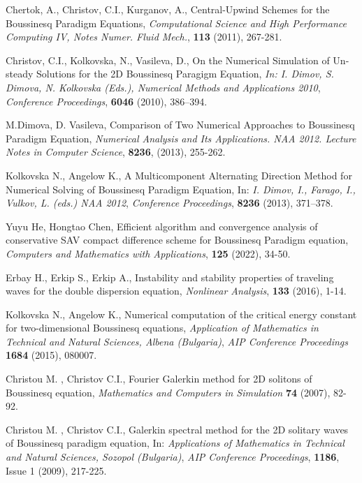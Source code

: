 \documentclass[a4paper]{article}
\theoremstyle{remark}
\begin{document}
\begin{large}
\begin{thebibliography}{99}
	 Chertok, A., Christov, C.I., Kurganov, A., Central-Upwind Schemes for the Boussinesq Paradigm Equations,
{\it Computational Science and High Performance Computing IV, Notes Numer. Fluid Mech.}, \textbf{113} (2011), 267-281.

	 Christov, C.I., Kolkovska, N., Vasileva, D., On the Numerical Simulation of Un-steady Solutions for the 2D Boussinesq Paragigm Equation,
{\it In: I. Dimov, S. Dimova, N. Kolkovska (Eds.), Numerical Methods and Applications 2010},
\emph{Conference Proceedings}, \textbf{6046} (2010), 386–394.

	 M.Dimova, D. Vasileva, Comparison of Two Numerical Approaches to Boussinesq Paradigm Equation, 
{\it Numerical Analysis and Its Applications. NAA 2012. Lecture Notes in Computer Science}, \textbf{8236}, (2013), 255-262.

	 Kolkovska N., Angelow K., A Multicomponent Alternating Direction Method for Numerical Solving of Boussinesq Paradigm Equation,
In: {\it  I. Dimov, I., Farago, I., Vulkov, L. (eds.) NAA 2012},
\emph{Conference Proceedings}, \textbf{8236} (2013), 371–378.

	 Yuyu He, Hongtao Chen, Efficient algorithm and convergence analysis of conservative SAV compact difference scheme for Boussinesq Paradigm equation, 
{\it Computers and Mathematics with Applications}, \textbf{125} (2022), 34-50.

	 Erbay H., Erkip S., Erkip A., Instability and stability properties of traveling waves for the double dispersion equation, {\it Nonlinear Analysis}, \textbf{133} (2016), 1-14.

	 Kolkovska N., Angelow K., Numerical computation of the critical energy constant for two-dimensional Boussinesq equations,
{\it Application of Mathematics in Technical and Natural Sciences, Albena (Bulgaria)},
\emph{AIP Conference Proceedings}  \textbf{1684} (2015), 080007.

	 Christou M. , Christov C.I.,
Fourier Galerkin method for 2D solitons of Boussinesq equation,
{\it Mathematics and Computers in Simulation} \textbf{74} (2007), 82-92.

	 Christou M. , Christov C.I.,
Galerkin spectral method for the 2D solitary waves of Boussinesq paradigm equation,
In: {\it Applications of Mathematics in Technical and Natural Sciences, Sozopol (Bulgaria)},
\emph{AIP Conference Proceedings}, \textbf{1186}, Issue 1 (2009), 217-225.


\end{thebibliography}
\end{large}
\end{document}
